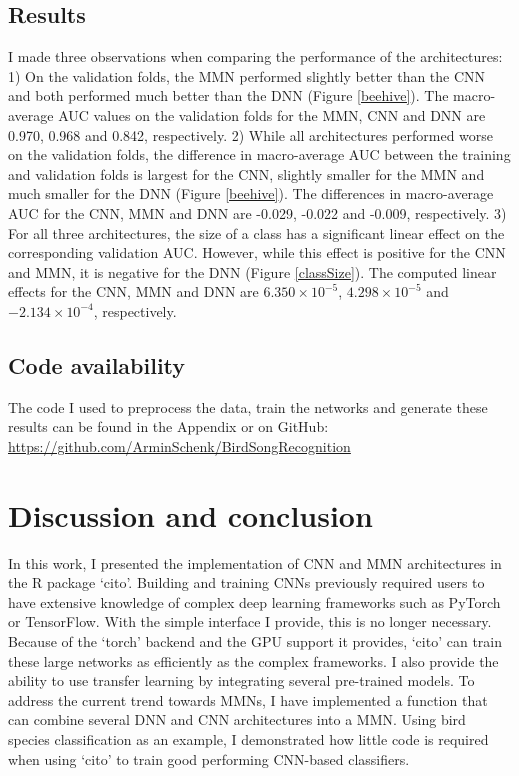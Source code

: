 \documentclass[12pt,twoside]{scrreport}
\newcommand{\pkg}[1]{`#1'}
\begin{document}
\section*{Results}

I made three observations when comparing the performance of the architectures: 1) On the validation folds, the MMN performed slightly better than the CNN and both performed much better than the DNN (Figure \ref{beehive}). The macro-average AUC values on the validation folds for the MMN, CNN and DNN are 0.970, 0.968 and 0.842, respectively. 2) While all architectures performed worse on the validation folds, the difference in macro-average AUC between the training and validation folds is largest for the CNN, slightly smaller for the MMN and much smaller for the DNN (Figure \ref{beehive}). The differences in macro-average AUC for the CNN, MMN and DNN are -0.029, -0.022 and -0.009, respectively. 3) For all three architectures, the size of a class has a significant linear effect on the corresponding validation AUC. However, while this effect is positive for the CNN and MMN, it is negative for the DNN (Figure \ref{classSize}). The computed linear effects for the CNN, MMN and DNN are $6.350\times10^{-5}$, $4.298\times10^{-5}$ and $-2.134\times10^{-4}$, respectively.

\section*{Code availability}
The code I used to preprocess the data, train the networks and generate these results can be found in the Appendix or on GitHub: \url{https://github.com/ArminSchenk/BirdSongRecognition}

\chapter*{Discussion and conclusion}
In this work, I presented the implementation of CNN and MMN architectures in the R package \pkg{cito}. Building and training CNNs previously required users to have extensive knowledge of complex deep learning frameworks such as PyTorch or TensorFlow. With the simple interface I provide, this is no longer necessary. Because of the \pkg{torch} backend and the GPU support it provides, \pkg{cito} can train these large networks as efficiently as the complex frameworks. I also provide the ability to use transfer learning by integrating several pre-trained models. To address the current trend towards MMNs, I have implemented a function that can combine several DNN and CNN architectures into a MMN. Using bird species classification as an example, I demonstrated how little code is required when using \pkg{cito} to train good performing CNN-based classifiers.
\end{document}
